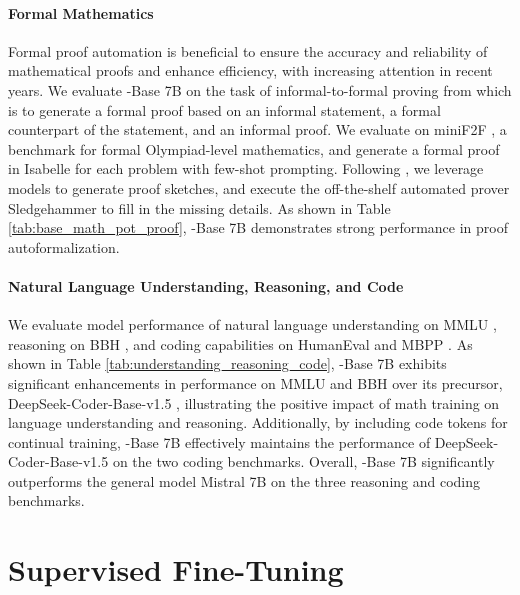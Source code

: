 \begingroup
\setlength{\tabcolsep}{3pt} 
\renewcommand{\arraystretch}{1} 

\endgroup


\paragraph{Formal Mathematics}

Formal proof automation is beneficial to ensure the accuracy and reliability of mathematical proofs and enhance efficiency, with increasing attention in recent years.
We evaluate \spmath-Base 7B on the task of informal-to-formal proving from \citep{dsp_proof} which is to generate a formal proof based on an informal statement, a formal counterpart of the statement, and an informal proof.
We evaluate on miniF2F \citep{minif2f}, a benchmark for formal Olympiad-level mathematics, and generate a formal proof in Isabelle for each problem with few-shot prompting.
Following \cite{dsp_proof}, we leverage models to generate proof sketches, and execute the off-the-shelf automated prover Sledgehammer \citep{sledgehammer} to fill in the missing details.
As shown in Table \ref{tab:base_math_pot_proof}, \spmath-Base 7B demonstrates strong performance in proof autoformalization.

\begingroup
\setlength{\tabcolsep}{3pt} 
\renewcommand{\arraystretch}{1} 

\endgroup

\paragraph{Natural Language Understanding, Reasoning, and Code}

We evaluate model performance of natural language understanding on MMLU \citep{mmlu}, reasoning on BBH \citep{bbh}, and coding capabilities on HumanEval \citep{codex} and MBPP \citep{mbpp}. As shown in Table \ref{tab:understanding_reasoning_code}, \spmath-Base 7B exhibits significant enhancements in performance on MMLU and BBH over its precursor, DeepSeek-Coder-Base-v1.5 \citep{deepseek-coder}, illustrating the positive impact of math training on language understanding and reasoning.
Additionally, by including code tokens for continual training, \spmath-Base 7B effectively maintains the performance of DeepSeek-Coder-Base-v1.5 on the two coding benchmarks.
Overall, \spmath-Base 7B significantly outperforms the general model Mistral 7B \citep{mistral} on the three reasoning and coding benchmarks.

\section{Supervised Fine-Tuning}

